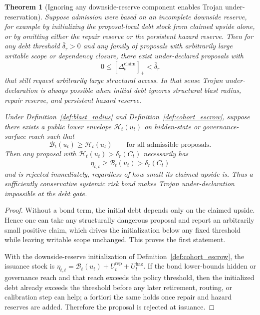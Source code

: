 \documentclass[11pt]{article}
\newtheorem{theorem}{Theorem}[section]
\theoremstyle{definition}
\newcommand{\1}{\mathbf{1}}
\begin{document}
\begin{theorem}[Ignoring any downside-reserve component enables Trojan under-reservation]\label{thm:blast_radius}
Suppose admission were based on an incomplete downside reserve, for example by initializing the proposal-local debt stock from claimed upside alone, or by omitting either the repair reserve or the persistent hazard reserve. Then for any debt threshold $\bar\delta_r>0$ and any family of proposals with arbitrarily large writable scope or dependency closure, there exist under-declared proposals with
\[
0\le [\Delta_t^{\mathrm{claim}}]_+<\bar\delta_r
\]
that still request arbitrarily large structural access. In that sense Trojan under-declaration is always possible when initial debt ignores structural blast radius, repair reserve, and persistent hazard reserve.

Under Definition~\ref{def:blast_radius} and Definition~\ref{def:cohort_escrow}, suppose there exists a public lower envelope $\mathcal H_t(u_t)$ on hidden-state or governance-surface reach such that
\[
\mathcal B_t(u_t)\ge \mathcal H_t(u_t)
\qquad\text{for all admissible proposals.}
\]
Then any proposal with $\mathcal H_t(u_t)>\bar\delta_r(C_t)$ necessarily has
\[
\eta_{t,t}\ge \mathcal B_t(u_t)>\bar\delta_r(C_t)
\]
and is rejected immediately, regardless of how small its claimed upside is. Thus a sufficiently conservative systemic risk bond makes Trojan under-declaration impossible at the debt gate.
\end{theorem}

\begin{proof}
Without a bond term, the initial debt depends only on the claimed upside. Hence one can take any structurally dangerous proposal and report an arbitrarily small positive claim, which drives the initialization below any fixed threshold while leaving writable scope unchanged. This proves the first statement.

With the downside-reserve initialization of Definition~\ref{def:cohort_escrow}, the issuance stock is $\eta_{t,t}=\mathcal B_t(u_t)+U_t^{\mathrm{rep}}+U_t^{\mathrm{haz}}$. If the bond lower-bounds hidden or governance reach and that reach exceeds the policy threshold, then the initialized debt already exceeds the threshold before any later retirement, routing, or calibration step can help; a fortiori the same holds once repair and hazard reserves are added. Therefore the proposal is rejected at issuance.
\end{proof}
\end{document}
